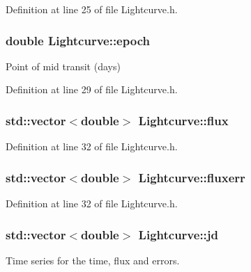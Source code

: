 Definition at line 25 of file Lightcurve.h.

\hypertarget{classLightcurve_aeb03d82f5ff13e75bbb40af674f6597a}{
\subsubsection[{epoch}]{\setlength{\rightskip}{0pt plus 5cm}double {\bf Lightcurve::epoch}}}
\label{classLightcurve_aeb03d82f5ff13e75bbb40af674f6597a}


Point of mid transit (days) 



Definition at line 29 of file Lightcurve.h.

\hypertarget{classLightcurve_a88801eb8e66a51a2e15fad1aa42f7129}{
\subsubsection[{flux}]{\setlength{\rightskip}{0pt plus 5cm}std::vector$<$double$>$ {\bf Lightcurve::flux}}}
\label{classLightcurve_a88801eb8e66a51a2e15fad1aa42f7129}


Definition at line 32 of file Lightcurve.h.

\hypertarget{classLightcurve_a4ef0c30138238483fe6a5573ed8838a7}{
\subsubsection[{fluxerr}]{\setlength{\rightskip}{0pt plus 5cm}std::vector$<$double$>$ {\bf Lightcurve::fluxerr}}}
\label{classLightcurve_a4ef0c30138238483fe6a5573ed8838a7}


Definition at line 32 of file Lightcurve.h.

\hypertarget{classLightcurve_a5bc412c5176599f90b4ae2fba5bd5f19}{
\subsubsection[{jd}]{\setlength{\rightskip}{0pt plus 5cm}std::vector$<$double$>$ {\bf Lightcurve::jd}}}
\label{classLightcurve_a5bc412c5176599f90b4ae2fba5bd5f19}


Time series for the time, flux and errors. 



